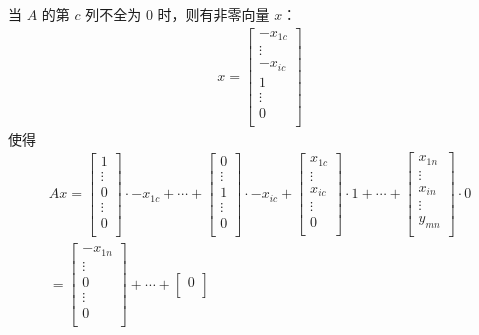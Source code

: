 \documentclass[UTF8,nofonts]{ctexart}
\begin{document}
当 $A$ 的第 $c$ 列不全为 0 时，则有非零向量 $x$：
\begin{gather*}
x=
\begin{bmatrix} 
-x_{1c}  \\ 
\vdots \\
-x_{ic} \\
1 \\
\vdots \\
0 \\
\end{bmatrix}
\end{gather*}
使得
\begin{gather*}
Ax=
\begin{bmatrix} 
1 \\ 
\vdots  \\
0 \\
\vdots \\
0 \\
\end{bmatrix}
\cdot -x_{1c} + \cdots +
\begin{bmatrix} 
0 \\ 
\vdots  \\
1 \\
\vdots \\
0 \\
\end{bmatrix} 
\cdot -x_{ic} + 
\begin{bmatrix} 
x_{1c} \\ 
\vdots  \\
x_{ic} \\
\vdots \\
0 \\
\end{bmatrix}
\cdot 1 + \cdots + 
\begin{bmatrix} 
x_{1n} \\ 
\vdots  \\
x_{in} \\
\vdots \\
y_{mn} \\
\end{bmatrix} 
\cdot 0 \\ 
=  
\begin{bmatrix} 
-x_{1n} \\ 
\vdots \\
0 \\
\vdots  \\
0 \\
\end{bmatrix} 
+ \cdots + 
\begin{bmatrix} 
0 \\

\end{bmatrix}
\end{gather*}
\end{document}
